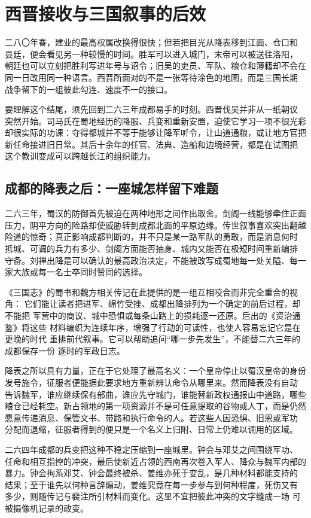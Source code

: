 \section{西晋接收与三国叙事的后效}
\label{sec:reader-jin-afterlife}

二八〇年春，建业的最高权属改换得很快；但若把目光从降表移到江面、仓口和
县廷，便会看见另一种较慢的时间。胜军可以进入城门，末帝可以被送往洛阳，
朝廷也可以立刻把胜利写进年号与诏令；旧吴的吏员、军队、粮仓和簿籍却不会在
同一日改用同一种语言。西晋所面对的不是一张等待涂色的地图，而是三国长期
战争留下的一组彼此勾连、速度不一的接口。

要理解这个结尾，须先回到二六三年成都易手的时刻。西晋伐吴并非从一纸朝议
突然开始。司马氏在蜀地经历的降服、兵变和重新安置，迫使它学习一项不很光彩
却很实际的功课：夺得都城并不等于能够让降军听令，让山道通粮，或让地方官把
新任命接进旧日常。其后十余年的任官、法典、造船和边境经营，都是在试图把
这个教训变成可以跨越长江的组织能力。

\subsection{成都的降表之后：一座城怎样留下难题}

二六三年，蜀汉的防御首先被迫在两种地形之间作出取舍。剑阁一线能够牵住正面
压力，阴平方向的险路却使威胁转到成都北面的平原边缘。传世叙事喜欢突出翻越
险道的惊奇；真正影响成都判断的，并不只是某一路军队的勇敢，而是消息何时
抵城、可调的兵力有多少、剑阁方面能否抽身、城内又能否在极短时间重新编排
守备。刘禅出降是可以确认的最高政治决定，不能被改写成蜀地每一处关隘、每一
家大族或每一名士卒同时赞同的选择。

《三国志》的蜀书和魏方相关传记在此提供的是一组互相咬合而非完全重合的视角：
它们能让读者把进军、绵竹受挫、成都出降排列为一个确定的前后过程，却不能把
军营中的商议、城中恐惧或每条山路上的损耗逐一还原。后出的《资治通鉴》将这些
材料编织为连续年序，增强了行动的可读性，也使人容易忘记它是在更晚的时代
重排前代叙事。它可以帮助追问“哪一步先发生”，不能替二六三年的成都保存一份
逐时的军政日志。

降表之所以具有力量，正在于它处理了最高名义：一个皇帝停止以蜀汉皇帝的身份
发号施令，征服者便能据此要求地方重新辨认命令从哪里来。然而降表没有自动
告诉魏军，谁应继续保有部曲，谁应先守城门，谁能替新政权通报山中道路，哪些
粮仓已经耗空。新占领地的第一项资源并不是可任意提取的谷物或人丁，而是仍然
愿意传递消息、保管文书、带路和执行命令的人。若这些人因恐惧、旧恩或军功
分配而退缩，征服者得到的便只是一个名义上归附、日常上仍难以调用的区域。

二六四年成都的兵变把这种不稳定压缩到一座城里。钟会与邓艾之间围绕军功、
任命和相互指控的冲突，最后使新近占领的西南再次卷入军人、降众与魏军内部的
暴力。钟会拘系邓艾、钟会最终被杀、姜维亦死于变乱，是几种材料都能支持的
结果；至于谁先以何种言辞煽动，姜维究竟在每一步参与到何种程度，死伤又有
多少，则随传记与裴注所引材料而变化。这里不宜把彼此冲突的文字缝成一场
可被摄像机记录的政变。

